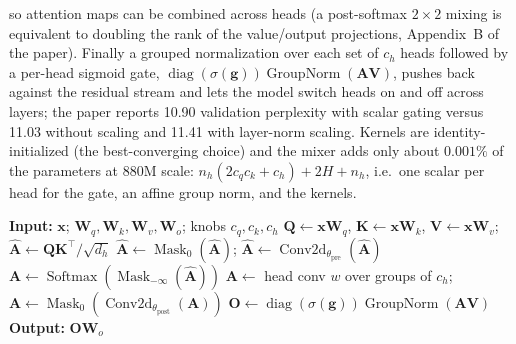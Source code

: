 so attention maps can be combined across heads (a post-softmax $2\times2$ mixing is equivalent to doubling the rank of the value/output projections, Appendix~B of the paper). Finally a grouped normalization over each set of $c_h$ heads followed by a per-head sigmoid gate, $\operatorname{diag}(\sigma(\mathbf{g}))\operatorname{GroupNorm}(\mathbf{A}\mathbf{V})$, pushes back against the residual stream and lets the model switch heads on and off across layers; the paper reports 10.90 validation perplexity with scalar gating versus 11.03 without scaling and 11.41 with layer-norm scaling. Kernels are identity-initialized (the best-converging choice) and the mixer adds only about $0.001\%$ of the parameters at 880M scale: $n_h(2c_qc_k + c_h) + 2H + n_h$, i.e.\ one scalar per head for the gate, an affine group norm, and the kernels.

\begin{algorithmic}[1]
\State \textbf{Input:} $\mathbf{x}$; $\mathbf{W}_q,\mathbf{W}_k,\mathbf{W}_v,\mathbf{W}_o$; knobs $c_q,c_k,c_h$
\State $\mathbf{Q}\gets\mathbf{x}\mathbf{W}_q$, $\mathbf{K}\gets\mathbf{x}\mathbf{W}_k$, $\mathbf{V}\gets\mathbf{x}\mathbf{W}_v$; $\hat{\mathbf{A}}\gets\mathbf{Q}\mathbf{K}^\top/\sqrt{d_h}$
\State $\hat{\mathbf{A}}\gets\operatorname{Mask}_{0}(\hat{\mathbf{A}})$; \quad $\hat{\mathbf{A}}\gets\operatorname{Conv2d}_{\theta_{\text{pre}}}(\hat{\mathbf{A}})$
\State $\mathbf{A}\gets\operatorname{Softmax}(\operatorname{Mask}_{-\infty}(\hat{\mathbf{A}}))$
\State $\mathbf{A}\gets$ head conv $w$ over groups of $c_h$; \quad $\mathbf{A}\gets\operatorname{Mask}_{0}(\operatorname{Conv2d}_{\theta_{\text{post}}}(\mathbf{A}))$
\State $\mathbf{O}\gets\operatorname{diag}(\sigma(\mathbf{g}))\operatorname{GroupNorm}(\mathbf{A}\mathbf{V})$
\State \textbf{Output:} $\mathbf{O}\mathbf{W}_o$
\end{algorithmic}

